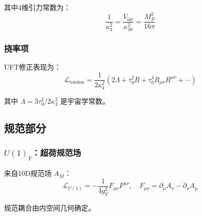 其中4维引力常数为：
\begin{equation}
    \frac{1}{\kappa_4^2} = \frac{V_{\text{int}}}{\kappa_{10}^2} = \frac{M_P^2}{16\pi}
\end{equation}

\subsubsection{挠率项}

UFT修正表现为：
\begin{equation}
    \mathcal{L}_{\text{torsion}} = \frac{1}{2\kappa_4^2}\left(2\Lambda + \tau_0^2 R + \tau_0^4 R_{\mu\nu}R^{\mu\nu} + \cdots\right)
\end{equation}

其中 $\Lambda = 3\tau_0^2/2\kappa_4^2$ 是宇宙学常数。

\subsection{规范部分}

\subsubsection{$U(1)_Y$：超荷规范场}

来自10D规范场 $A_M$：
\begin{equation}
    \mathcal{L}_{U(1)} = -\frac{1}{4g_Y^2}F_{\mu\nu}F^{\mu\nu}, \quad F_{\mu\nu} = \partial_\mu A_\nu - \partial_\nu A_\mu
\end{equation}

规范耦合由内空间几何确定。
